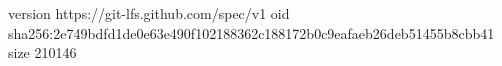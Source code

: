 version https://git-lfs.github.com/spec/v1
oid sha256:2e749bdfd1de0e63e490f102188362c188172b0c9eafaeb26deb51455b8cbb41
size 210146
